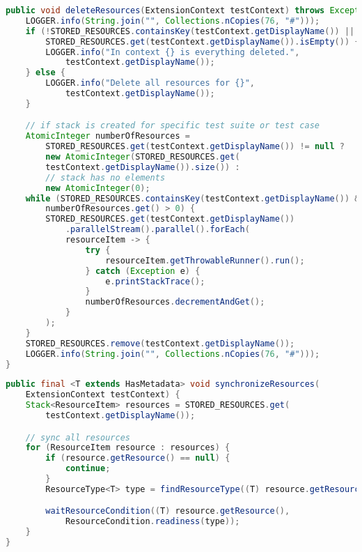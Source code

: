 \begin{lstlisting}[language=Java,label=resourcemanager:complete:delete:method,caption=Complete thead-safe method for parallel deletion resources,frame=tb]
public void deleteResources(ExtensionContext testContext) throws Exception {
    LOGGER.info(String.join("", Collections.nCopies(76, "#")));
    if (!STORED_RESOURCES.containsKey(testContext.getDisplayName()) ||
        STORED_RESOURCES.get(testContext.getDisplayName()).isEmpty()) {
        LOGGER.info("In context {} is everything deleted.",
            testContext.getDisplayName());
    } else {
        LOGGER.info("Delete all resources for {}",
            testContext.getDisplayName());
    }

    // if stack is created for specific test suite or test case
    AtomicInteger numberOfResources =
        STORED_RESOURCES.get(testContext.getDisplayName()) != null ?
        new AtomicInteger(STORED_RESOURCES.get(
        testContext.getDisplayName()).size()) :
        // stack has no elements
        new AtomicInteger(0);
    while (STORED_RESOURCES.containsKey(testContext.getDisplayName()) &&
        numberOfResources.get() > 0) {
        STORED_RESOURCES.get(testContext.getDisplayName())
            .parallelStream().parallel().forEach(
            resourceItem -> {
                try {
                    resourceItem.getThrowableRunner().run();
                } catch (Exception e) {
                    e.printStackTrace();
                }
                numberOfResources.decrementAndGet();
            }
        );
    }
    STORED_RESOURCES.remove(testContext.getDisplayName());
    LOGGER.info(String.join("", Collections.nCopies(76, "#")));
}
\end{lstlisting}


\begin{lstlisting}[language=Java,label=resourcemanager:complete:sync:method,caption=Complete thead-safe method for synchronize resources,frame=tb]
public final <T extends HasMetadata> void synchronizeResources(
    ExtensionContext testContext) {
    Stack<ResourceItem> resources = STORED_RESOURCES.get(
        testContext.getDisplayName());

    // sync all resources
    for (ResourceItem resource : resources) {
        if (resource.getResource() == null) {
            continue;
        }
        ResourceType<T> type = findResourceType((T) resource.getResource());

        waitResourceCondition((T) resource.getResource(),
            ResourceCondition.readiness(type));
    }
}
\end{lstlisting}

